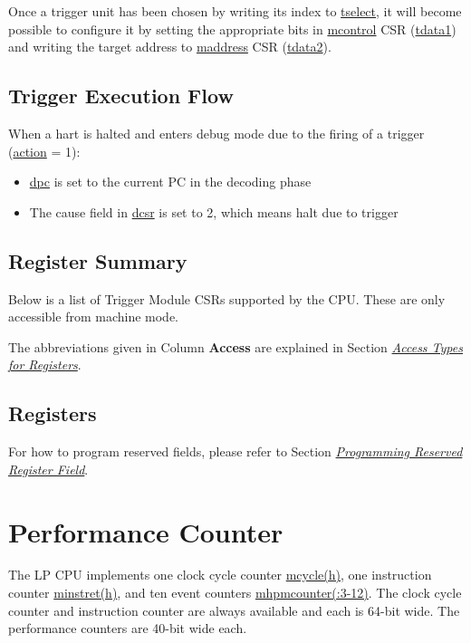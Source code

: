 \documentclass[main\_\_EN.tex]{subfiles}
\begin{document}
Once a trigger unit has been chosen by writing its index to \hyperref[regdesc:LPTSELECT]{tselect}, it will become possible to configure it by setting the appropriate bits in \hyperref[regdesc:LPMCONTROL]{mcontrol} CSR (\hyperref[regdesc:LPTDATA1]{tdata1}) and writing the target address to \hyperref[regdesc:LPMADDRESS]{maddress} CSR (\hyperref[regdesc:LPTDATA2]{tdata2}).


\subsection{Trigger Execution Flow}
\label{sec:ulp-hwt-suggest-op}

When a hart is halted and enters debug mode due to the firing of a trigger (\hyperref[fielddesc:LPMCONTROLACTION]{action} = 1):
\begin{itemize}
    \item \hyperref[regdesc:LPDPC]{dpc} is set to the current PC in the decoding phase
    \item The cause field in \hyperref[regdesc:LPDCSR]{dcsr} is set to 2, which means halt due to trigger
\end{itemize}


\subsection{Register Summary}
Below is a list of Trigger Module CSRs supported by the CPU. These are only accessible from machine mode.

The abbreviations given in Column \textbf{Access} are explained in Section \hyperref[glossary-access-types]{\textit{Access Types for Registers}}.



\subsection{Registers}

For how to program reserved fields, please refer to Section \hyperref[programming-reserved-field]{\textit{Programming Reserved Register Field}}.




\section{Performance Counter}

The LP CPU implements one clock cycle counter \hyperref[regdesc:LPMCYCLE]{mcycle(h)}, one instruction counter \hyperref[regdesc:LPMINSTRET]{minstret(h)}, and ten event counters \hyperref[regdesc:LPMHPMCOUNTER]{mhpmcounter(:3-12)}. The clock cycle counter and instruction counter are always available and each is 64-bit wide. The performance counters are 40-bit wide each.
\end{document}
